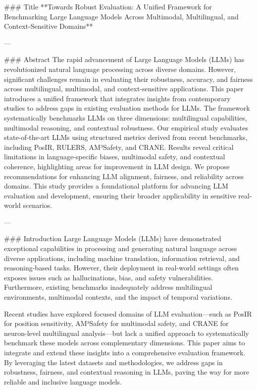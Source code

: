 ### Title  
**Towards Robust Evaluation: A Unified Framework for Benchmarking Large Language Models Across Multimodal, Multilingual, and Context-Sensitive Domains**

---

### Abstract  
The rapid advancement of Large Language Models (LLMs) has revolutionized natural language processing across diverse domains. However, significant challenges remain in evaluating their robustness, accuracy, and fairness across multilingual, multimodal, and context-sensitive applications. This paper introduces a unified framework that integrates insights from contemporary studies to address gaps in existing evaluation methods for LLMs. The framework systematically benchmarks LLMs on three dimensions: multilingual capabilities, multimodal reasoning, and contextual robustness. Our empirical study evaluates state-of-the-art LLMs using structured metrics derived from recent benchmarks, including PosIR, RULERS, AM³Safety, and CRANE. Results reveal critical limitations in language-specific biases, multimodal safety, and contextual coherence, highlighting areas for improvement in LLM design. We propose recommendations for enhancing LLM alignment, fairness, and reliability across domains. This study provides a foundational platform for advancing LLM evaluation and development, ensuring their broader applicability in sensitive real-world scenarios.

---

### Introduction  
Large Language Models (LLMs) have demonstrated exceptional capabilities in processing and generating natural language across diverse applications, including machine translation, information retrieval, and reasoning-based tasks. However, their deployment in real-world settings often exposes issues such as hallucinations, bias, and safety vulnerabilities. Furthermore, existing benchmarks inadequately address multilingual environments, multimodal contexts, and the impact of temporal variations.

Recent studies have explored focused domains of LLM evaluation—such as PosIR for position sensitivity, AM³Safety for multimodal safety, and CRANE for neuron-level multilingual analysis—but lack a unified approach to systematically benchmark these models across complementary dimensions. This paper aims to integrate and extend these insights into a comprehensive evaluation framework. By leveraging the latest datasets and methodologies, we address gaps in robustness, fairness, and contextual reasoning in LLMs, paving the way for more reliable and inclusive language models.

